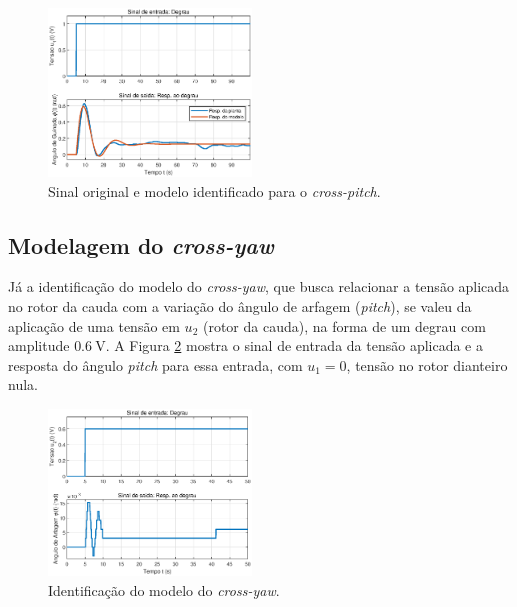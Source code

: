 \begin{figure}[H]
    \centering
    \includegraphics[width=0.48\textwidth]{figures/Identificacao/IdentificaCrossPitchFinal.eps}
    \caption{Sinal original e modelo identificado para o \textit{cross-pitch}.}
    \label{fig:IdentificacaoCrossPitchFinal}
\end{figure}

\subsection{\textbf{Modelagem do \textit{cross-yaw}}}

Já a identificação do modelo do \textit{cross-yaw}, que busca relacionar a tensão aplicada no rotor da cauda com a variação do ângulo de arfagem (\textit{pitch}), se valeu da aplicação de uma tensão em $u_{2}$ (rotor da cauda), na forma de um degrau com amplitude $\SI{0.6}{\volt}$. A Figura \ref{fig:IdentificacaoCrossYawInicial} mostra o sinal de entrada da tensão aplicada e a resposta do ângulo \textit{pitch} para essa entrada, com $u_{1} = 0$, tensão no rotor dianteiro nula.

\begin{figure}[H]
    \centering
    \includegraphics[width=0.48\textwidth]{figures/Identificacao/IdentificaCrossYawInicial.eps}
    \caption{Identificação do modelo do \textit{cross-yaw}.}
    \label{fig:IdentificacaoCrossYawInicial}
\end{figure}

